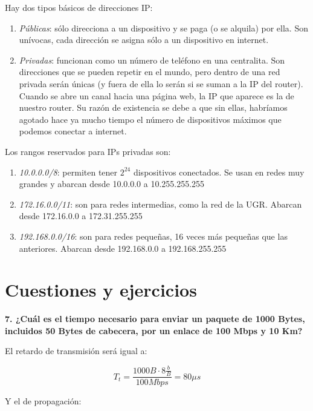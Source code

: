 \documentclass[10pt,a4paper,spanish]{report}
\begin{document}
Hay dos tipos básicos de direcciones IP:
\begin{enumerate}[\color{tema1}{$\bigstar$}]
  \item \textit{\textcolor{tema1}{Públicas}}: sólo direcciona a un dispositivo y se paga (o se alquila) por ella. Son unívocas, cada dirección se asigna sólo a un dispositivo en internet.

  \item \textit{\textcolor{tema1}{Privadas}}: funcionan como un número de teléfono en una centralita. Son direcciones que se pueden repetir en el mundo, pero dentro de una red privada serán únicas (y fuera de ella lo serán si se suman a la IP del router). Cuando se abre un canal hacia una página web, la IP que aparece es la de nuestro router. Su razón de existencia se debe a que sin ellas, habríamos agotado hace ya mucho tiempo el número de dispositivos máximos que podemos conectar a internet.
\end{enumerate}

Los rangos reservados para IPs privadas son:
\begin{enumerate}[\color{tema1}{$\clubsuit$}]
  \item \textit{\textcolor{tema1}{10.0.0.0/8}}: permiten tener $2^{24}$ dispositivos conectados. Se usan en redes muy grandes y abarcan desde 10.0.0.0 a 10.255.255.255
  \item \textit{\textcolor{tema1}{172.16.0.0/11}}: son para redes intermedias, como la red de la UGR. Abarcan desde 172.16.0.0 a 172.31.255.255
  \item \textit{\textcolor{tema1}{192.168.0.0/16}}: son para redes pequeñas, 16 veces más pequeñas que las anteriores. Abarcan desde 192.168.0.0 a 192.168.255.255
\end{enumerate}

\section{\textcolor{tema1}Cuestiones y ejercicios}
\textbf{7. ¿Cuál es el tiempo necesario para enviar un paquete de 1000 Bytes, incluidos 50 Bytes de cabecera, por un enlace de 100 Mbps y 10 Km?}

El retardo de transmisión será igual a:

\begin{displaymath}
  T_t = \frac{1000 B \cdot 8 \frac{b}{B}}{100 Mbps} = 80 \mu s
\end{displaymath}

Y el de propagación:
\end{document}
